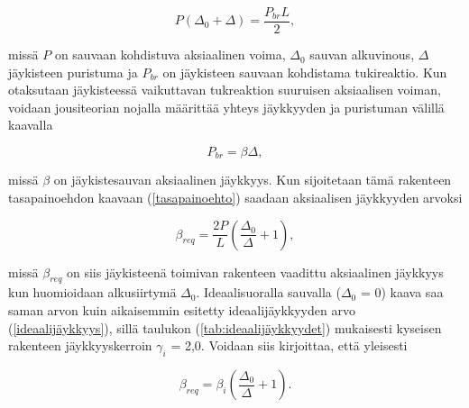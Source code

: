 \documentclass[12pt]{article}
\newenvironment{content}{\pagenumbering{arabic}}{}
\begin{document}
\begin{content}
\begin{equation}
\label{tasapainoehto}
P (\Delta_0 + \Delta) = \frac{P_{br} L}{2},
\end{equation}

missä $P$ on sauvaan kohdistuva aksiaalinen voima, $\Delta_0$ sauvan alkuvinous, $\Delta$ jäykisteen puristuma ja $P_{br}$ on jäykisteen sauvaan kohdistama tukireaktio. Kun otaksutaan jäykisteessä vaikuttavan tukreaktion suuruisen aksiaalisen voiman, voidaan jousiteorian nojalla määrittää yhteys jäykkyyden ja puristuman välillä kaavalla

\begin{equation}
\label{jousiteoria}
P_{br} = \beta \Delta,
\end{equation}

missä $\beta$ on jäykistesauvan aksiaalinen jäykkyys. Kun sijoitetaan tämä rakenteen tasapainoehdon kaavaan (\ref{tasapainoehto}) saadaan aksiaalisen jäykkyyden arvoksi

\begin{equation}
\label{breq}
\beta_{req} = \frac{2 P}{L} (\frac{\Delta_0}{\Delta} + 1),
\end{equation}

missä $\beta_{req}$ on siis jäykisteenä toimivan rakenteen vaadittu aksiaalinen jäykkyys kun huomioidaan alkusiirtymä $\Delta_0$. Ideaalisuoralla sauvalla ($\Delta_0$ = 0) kaava saa saman arvon kuin aikaisemmin esitetty ideaalijäykkyyden arvo (\ref{ideaalijäykkyys}), sillä taulukon (\ref{tab:ideaalijäykkyydet}) mukaisesti kyseisen rakenteen jäykkyyskerroin $\gamma_i$ = 2,0. Voidaan siis kirjoittaa, että yleisesti

\begin{equation}
\label{breq_2}
\beta_{req} = \beta_i (\frac{\Delta_0}{\Delta} + 1).
\end{equation}







\end{content}
\end{document}
